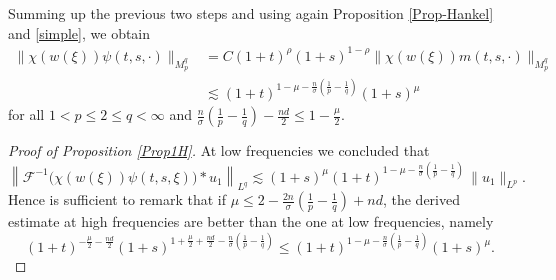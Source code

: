 \documentclass[10pt]{article}
\newcommand{\<}{\langle}
\renewcommand{\>}{\rangle}
\numberwithin{equation}{section}
\begin{document}
Summing up the previous two steps and  using again Proposition \ref{Prop-Hankel} and \eqref{simple},  we obtain
\begin{align*}
\|\chi(w(\xi))\psi(t,s,\cdot)\|_{M_p^q} &=C(1+t)^{\rho}(1+s)^{1-\rho}\|\chi(w(\xi))m(t,s,\cdot)\|_{M_p^q} \\
& \lesssim (1+t)^{1-\mu-\frac{n}{\sigma}\left( \frac{1}{p}-\frac{1}{q} \right)} (1+s)^{\mu}
\end{align*}
for all $1<p\leq 2\leq q<\infty$ and $\frac{n}{\sigma}\left(\frac1p-\frac1q\right)- \frac{nd}{2}\leq 1-\frac{\mu}{2}$.


\begin{proof}[Proof of Proposition \ref{Prop1H}]
At low frequencies we concluded that
\[ \left\| \mathcal{F}^{-1}\big( \chi(w(\xi))\psi(t,s,\xi) \big)\ast u_1 \right\|_{L^q} \lesssim (1+s)^{\mu}(1+t)^{1 - \mu - \frac{n}{\sigma}(\frac{1}{p} - \frac{1}{q})}\, \|u_1\|_{L^p}. \]
Hence is sufficient to remark that if $\mu\leq 2-\frac{2n}{\sigma}\left(\frac1p-\frac1q\right)+nd$,  the derived  estimate at high frequencies are better than the one at low frequencies, namely
\[(1+t)^{-\frac{\mu}2-\frac{nd}2}
(1+s)^{1+\frac{\mu}2 +\frac{nd}2-\frac{n}{\sigma}\left(\frac1p-\frac1q\right)}\leq (1+t)^{1 - \mu - \frac{n}{\sigma}(\frac{1}{p} - \frac{1}{q})}(1+s)^{\mu}.
\]
\end{proof}
\end{document}
